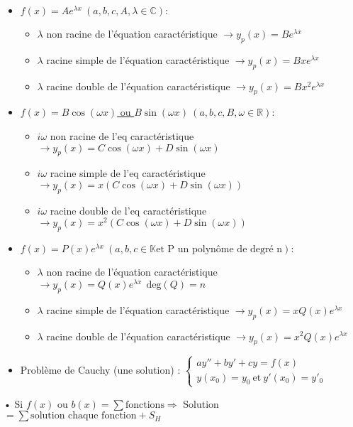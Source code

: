 \documentclass[12 pt]{book}
\begin{document}
\begin{flushleft}
\begin{doublespace}
\begin{itemize}
		\item \underline{$f(x) = A e^{\lambda x} \ (a,b,c,A,\lambda \in \mathbb{C}):$}
			\begin{itemize}
				\item $\lambda$ non racine de l'équation caractéristique $\rightarrow y_p(x) = B e^{\lambda x}$
				\item $\lambda$ racine simple de l'équation caractéristique $\rightarrow y_p(x) =  Bx e^{\lambda x}$
				\item $\lambda$ racine double de l'équation caractéristique $\rightarrow y_p(x) = Bx^2 e^{\lambda x}$
			\end{itemize}
		
		\item \underline{$f(x) = B\cos(\omega x)$ ou $ B\sin(\omega x) \ (a,b,c,B,\omega \in \mathbb{R}):$}
			\begin{itemize}
				\item $i\omega$ non racine de l'eq caractéristique $\rightarrow y_p(x) = C \cos(\omega x) + D \sin(\omega x)$
				\item $i\omega$ racine simple de l'eq caractéristique $\rightarrow y_p(x) =  x (C \cos(\omega x) + D \sin(\omega x))$
				\item $i\omega$ racine double de l'eq caractéristique $\rightarrow y_p(x) = x^2 (C \cos(\omega x) + D \sin(\omega x))$
			\end{itemize}
		\item \underline{$f(x) = P(x) e^{\lambda x} \ (a,b,c \in \mathbb{K} \text{et P un polynôme de degré n}):$}
			\begin{itemize}
				\item $\lambda$ non racine de l'équation caractéristique $\rightarrow y_p(x) = Q(x) e^{\lambda x} \ \ \text{deg}(Q)=n$
				\item $\lambda$ racine simple de l'équation caractéristique $\rightarrow y_p(x) =  xQ(x) e^{\lambda x}$
				\item $\lambda$ racine double de l'équation caractéristique $\rightarrow y_p(x) = x^2Q(x) e^{\lambda x}$
			\end{itemize}
		\item Problème de Cauchy (une solution) :  $ \left\{\begin{array}{ll} ay''+ by' + cy = f(x) \\  y(x_0) = y_0 \ \text{et}\ y'(x_0)=y'_0 \end{array} \right.$
	\end{itemize}
	• Si $f(x)$ ou $b(x) = \sum \text{fonctions} \Rightarrow$ Solution$ = \sum \text{solution chaque fonction} + S_H$

\end{doublespace}
\end{flushleft}
\end{document}
